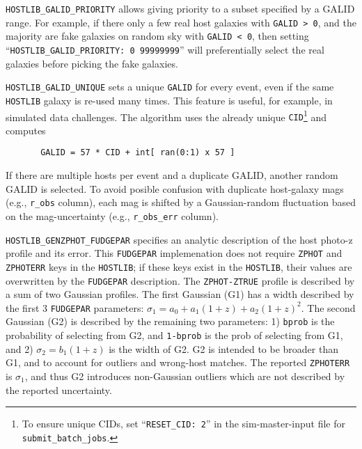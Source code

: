 \documentclass[12pt]{article}
\newcommand{\unc}{uncertainty}
\begin{document}
{%
{\tt HOSTLIB\_GALID\_PRIORITY} allows giving priority to a
subset specified by a GALID range. For example, if there only
a few real host galaxies with {\tt GALID > 0}, 
and the majority are fake galaxies on random sky
with {\tt GALID < 0}, then setting 
``{\tt HOSTLIB\_GALID\_PRIORITY: 0 99999999}''  will preferentially
select the real galaxies before picking the fake galaxies.

{\tt HOSTLIB\_GALID\_UNIQUE} sets a unique {\tt GALID} for every event, 
even if the same {\tt HOSTLIB} galaxy is re-used many times. This 
feature is useful, for example, in simulated data challenges.
The algorithm uses the already unique 
{\tt CID}\footnote{To ensure unique CIDs, set ``{\tt RESET\_CID: 2}''
   in the sim-master-input file for {\tt submit\_batch\_jobs}.}
and computes 
\vspace{-0.1in}
\begin{verbatim}
       GALID = 57 * CID + int[ ran(0:1) x 57 ]
\end{verbatim}
\vspace{-0.1in}
If there are multiple hosts per event and a duplicate GALID,
another random GALID is selected. To avoid posible confusion with
duplicate host-galaxy mags (e.g., {\tt r\_obs} column), 
each mag is shifted by a Gaussian-random fluctuation based on the 
mag-uncertainty (e.g., {\tt r\_obs\_err} column).

{\tt HOSTLIB\_GENZPHOT\_FUDGEPAR} specifies an analytic description
of the host photo-z profile and its error.
This {\tt FUDGEPAR} implemenation does not require
{\tt ZPHOT} and {\tt ZPHOTERR} keys in the {\tt HOSTLIB}; 
if these keys exist in the {\tt HOSTLIB}, 
their values are overwritten by the
{\tt FUDGEPAR} description. 
The {\tt ZPHOT-ZTRUE} profile is described by a sum of two 
Gaussian profiles. The first Gaussian (G1) has a width described 
by the first 3 {\tt FUDGEPAR} parameters:
$\sigma_1 = a_0 + a_1(1+z) + a_2(1+z)^2$. 
The second Gaussian (G2) is described by the remaining two parameters:
1) {\tt bprob} is the probability of selecting from G2,
and {\tt 1-bprob} is the prob of selecting from G1,
and 2) $\sigma_2 = b_1(1+z)$ is the width of G2.
G2 is intended to be broader than G1, 
and to account for outliers and wrong-host matches.
The reported {\tt ZPHOTERR} is $\sigma_1$, and thus G2
introduces non-Gaussian outliers which are not described
by the reported \unc.

}
\end{document}
